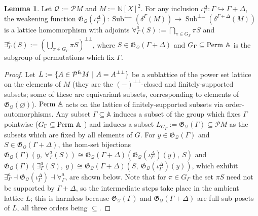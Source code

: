 \documentclass{article}
\theoremstyle{definition}
\newtheorem{lemma}{Lemma}[section]
\newcommand{\N}{\mathbb{N}}
\newcommand{\A}{\mathbb{A}}
\newcommand{\G}{\mathfrak{G}}
\newcommand{\cP}{\mathcal{P}}
\newcommand{\cQ}{\mathcal{Q}}
\newcommand{\Sub}{\operatorname{Sub}}
\begin{document}
\begin{lemma}
    \label{lemma:adj}
     Let $\cQ:=\cP M$ and $M:= \N[X]^2$. For any inclusion $\iota^\Delta_\Gamma\colon \Gamma\hookrightarrow \Gamma+\Delta$, the weakening function $\G_\cQ(\iota^\Delta_\Gamma)\colon \Sub^{\bot\bot}(\delta^\Gamma(M))\rightarrow \Sub^{\bot\bot}(\delta^{\Gamma+\Delta}(M))$ is a lattice homomorphism with adjoints $\forall^a_\Gamma(S):=\bigcap_{\pi\in G_\Gamma} \pi S$ and $\exists^a_\Gamma(S):=(\bigcup_{\pi \in G_\Gamma} \pi S)^{\bot\bot}$, where $S \in \G_\cQ(\Gamma+\Delta)$ and $G_\Gamma \subseteq {\rm Perm\ }\A$ is the subgroup of permutations which fix $\Gamma$. 
\end{lemma}

\begin{proof}

    Let $L:=\{A \in \cP^{\rm fs} M\ |\ A=A^{\bot\bot}\}$ be a sublattice of the power set lattice on the elements of $M$ (they are the $(-)^{\bot\bot}$-closed and finitely-supported subsets; some of these are equivariant subsets, corresponding to elements of $\G_\cQ(\varnothing)$). ${\rm Perm }\ \A$ acts on the lattice of finitely-supported subsets via order-automorphisms. Any subset $\Gamma\subseteq \A$ induces a subset of the group which fixes $\Gamma$ pointwise ($G_\Gamma\subseteq {\rm Perm}\ \A$ ) and induces a subset $L_{G_\Gamma}:= \G_\cQ(\Gamma) \subseteq \cP M$ as the subsets which are fixed by all elements of $G$. For $y \in \G_\cQ(\Gamma)$ and $S \in \G_\cQ(\Gamma+\Delta)$, the hom-set bijections $\G_\cQ(\Gamma)(y,\ \forall^a_\Gamma(S)) \cong \G_\cQ(\Gamma+\Delta)(\G_\cQ(\iota^\Delta_\Gamma)(y),\ S)$ and $\G_\cQ(\Gamma)(\exists^a_\Gamma(S),\ y) \cong \G_\cQ(\Gamma+\Delta)(S,\ \G_\cQ(\iota^\Delta_\Gamma)(y))$, which exhibit $\exists^a_\Gamma \dashv \G_\cQ(\iota^\Delta_\Gamma) \dashv \forall^a_\Gamma$, are shown below. Note that for $\pi \in G_\Gamma$ the set $\pi S$ need not be supported by $\Gamma+\Delta$, so the intermediate steps take place in the ambient lattice $L$; this is harmless because $\G_\cQ(\Gamma)$ and $\G_\cQ(\Gamma+\Delta)$ are full sub-posets of $L$, all three orders being $\subseteq$.


\end{proof}
\end{document}
